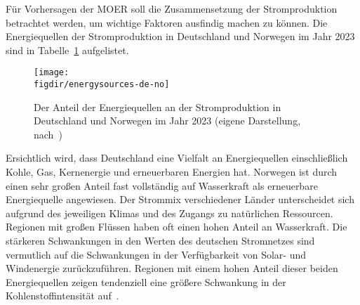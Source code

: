 
Für Vorhersagen der \ac{MOER} soll die Zusammensetzung der Stromproduktion betrachtet werden, um wichtige Faktoren ausfindig machen zu können.
Die Energiequellen der Stromproduktion in Deutschland und Norwegen im Jahr 2023 sind in Tabelle~\ref{FIG:energysources-de-no} aufgelistet.
\begin{figure}
 \caption[Energiequellen der Strompoduktion von Deutschland und Norwegen 2023]{Der Anteil der Energiequellen an der Stromproduktion in Deutschland und Norwegen im Jahr 2023 (eigene Darstellung, nach~\cite{ElectricityMaps.20240305T20:54:29.000Z})}
 {\texttt{[image: \\figdir/energysources-de-no]}}
 \label{FIG:energysources-de-no}
\end{figure}
Ersichtlich wird, dass Deutschland eine Vielfalt an Energiequellen einschließlich Kohle, Gas, Kernenergie und erneuerbaren Energien hat.
Norwegen ist durch einen sehr großen Anteil fast vollständig auf Wasserkraft als erneuerbare Energiequelle angewiesen.
Der Strommix verschiedener Länder unterscheidet sich aufgrund des jeweiligen Klimas und des Zugangs zu natürlichen Ressourcen.
Regionen mit großen Flüssen haben oft einen hohen Anteil an Wasserkraft.
Die stärkeren Schwankungen in den Werten des deutschen Stromnetzes sind vermutlich auf die Schwankungen in der Verfügbarkeit von Solar- und Windenergie zurückzuführen.
Regionen mit einem hohen Anteil dieser beiden Energiequellen zeigen tendenziell eine größere Schwankung in der Kohlenstoffintensität auf~\cite{Sukprasert.2023}.

